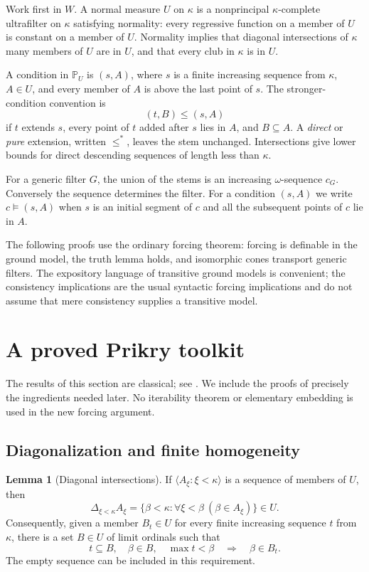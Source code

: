 \documentclass[11pt,letterpaper]{article}
\theoremstyle{definition}
\newtheorem{lemma}[definition]{Lemma}
\numberwithin{equation}{section}
\newcommand{\PPU}{\mathbb P_U}
\begin{document}
Work first in $W$. A normal measure $U$ on $\kappa$ is a nonprincipal $\kappa$-complete ultrafilter on $\kappa$ satisfying normality: every regressive function on a member of $U$ is constant on a member of $U$. Normality implies that diagonal intersections of $\kappa$ many members of $U$ are in $U$, and that every club in $\kappa$ is in $U$.

A condition in $\PPU$ is $(s,A)$, where $s$ is a finite increasing sequence from $\kappa$, $A\in U$, and every member of $A$ is above the last point of $s$. The stronger-condition convention is
\[
 (t,B)\le(s,A)
\]
if $t$ extends $s$, every point of $t$ added after $s$ lies in $A$, and $B\subseteq A$. A \emph{direct} or \emph{pure} extension, written $\le^*$, leaves the stem unchanged. Intersections give lower bounds for direct descending sequences of length less than $\kappa$.

For a generic filter $G$, the union of the stems is an increasing $\omega$-sequence $c_G$. Conversely the sequence determines the filter. For a condition $(s,A)$ we write $c\models(s,A)$ when $s$ is an initial segment of $c$ and all the subsequent points of $c$ lie in $A$.

The following proofs use the ordinary forcing theorem: forcing is definable in the ground model, the truth lemma holds, and isomorphic cones transport generic filters. The expository language of transitive ground models is convenient; the consistency implications are the usual syntactic forcing implications and do not assume that mere consistency supplies a transitive model.

\section{A proved Prikry toolkit}\label{sec:toolkit}

The results of this section are classical; see \cite[\S3]{benhamou}. We include the proofs of precisely the ingredients needed later. No iterability theorem or elementary embedding is used in the new forcing argument.

\subsection{Diagonalization and finite homogeneity}

\begin{lemma}[Diagonal intersections]\label{lem:diagonal}
If $\langle A_\xi:\xi<\kappa\rangle$ is a sequence of members of $U$, then
\[
 \Delta_{\xi<\kappa}A_\xi
 =\{\beta<\kappa:\forall\xi<\beta\ (\beta\in A_\xi)\}
 \in U.
\]
Consequently, given a member $B_t\in U$ for every finite increasing sequence $t$ from $\kappa$, there is a set $B\in U$ of limit ordinals such that
\[
 t\subseteq B,\quad \beta\in B,\quad \max t<\beta
 \quad\Longrightarrow\quad \beta\in B_t.
 \tag{\(*\)}\label{eq:diagfinite}
\]
The empty sequence can be included in this requirement.
\end{lemma}
\end{document}
